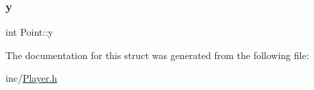 \mbox{\label{structPoint_a2e1b5fb2b2a83571f5c0bc0f66a73cf7}} 
\subsubsection{\texorpdfstring{y}{y}}
{\footnotesize\ttfamily int Point\+::y}



The documentation for this struct was generated from the following file\+:\begin{DoxyCompactItemize}
\item 
inc/\hyperlink{Player_8h}{Player.\+h}\end{DoxyCompactItemize}
